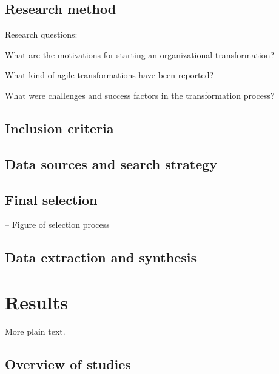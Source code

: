 \documentclass[lnbip]{svmultln}
\begin{document}
\lipsum[1]


\subsection{Research method}
\label{sec:method}

Research questions:

What are the motivations for starting an organizational transformation?

What kind of agile transformations have been reported?

What were challenges and success factors in the transformation process?

\subsection{Inclusion criteria}

\lipsum[1]

\subsection{Data sources and search strategy}

\lipsum[1]

\subsection{Final selection}

-- Figure of selection process

\lipsum[1]

\subsection{Data extraction and synthesis}

\lipsum[1]


\section{Results}
\label{sec:results}

More plain text.

\subsection{Overview of studies}

\lipsum[1]
\end{document}
